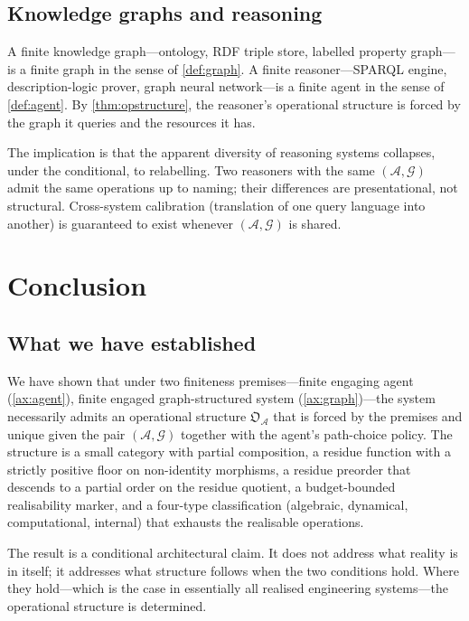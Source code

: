 \documentclass[11pt,twocolumn,a4paper]{article}
\theoremstyle{thmstyle}
\theoremstyle{definition}
\theoremstyle{remark}
\newcommand{\Graph}{\mathcal{G}}
\newcommand{\Agent}{\mathcal{A}}
\newcommand{\OpStr}{\mathfrak{O}}
\begin{document}
\subsection{Knowledge graphs and reasoning}

A finite knowledge graph---ontology, RDF triple store, labelled
property graph---is a finite graph in the sense of \cref{def:graph}.
A finite reasoner---SPARQL engine, description-logic prover, graph
neural network---is a finite agent in the sense of \cref{def:agent}.
By \cref{thm:opstructure}, the reasoner's operational structure is
forced by the graph it queries and the resources it has.

The implication is that the apparent diversity of reasoning systems
collapses, under the conditional, to relabelling. Two reasoners
with the same $(\Agent, \Graph)$ admit the same operations up to
naming; their differences are presentational, not structural.
Cross-system calibration (translation of one query language into
another) is guaranteed to exist whenever $(\Agent, \Graph)$ is
shared.

\section{Conclusion}
\label{sec:conclusion}

\subsection{What we have established}

We have shown that under two finiteness premises---finite engaging
agent (\cref{ax:agent}), finite engaged graph-structured system
(\cref{ax:graph})---the system necessarily admits an operational
structure $\OpStr_\Agent$ that is forced by the premises and unique
given the pair $(\Agent, \Graph)$ together with the agent's
path-choice policy. The structure is a small category with partial
composition, a residue function with a strictly positive floor on
non-identity morphisms, a residue preorder that descends to a
partial order on the residue quotient, a budget-bounded
realisability marker, and a four-type classification (algebraic,
dynamical, computational, internal) that exhausts the realisable
operations.

The result is a conditional architectural claim. It does not
address what reality is in itself; it addresses what structure
follows when the two conditions hold. Where they hold---which is
the case in essentially all realised engineering systems---the
operational structure is determined.
\end{document}
